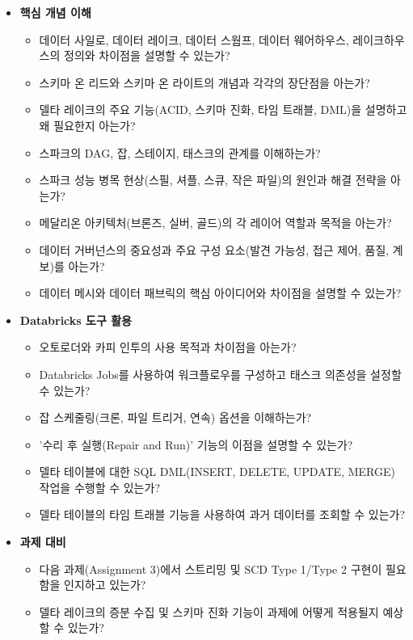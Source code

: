 \documentclass[11pt,a4paper]{article}
\begin{document}
\begin{tcolorbox}[title=\textbf{CSCI103 Lecture 5 학습 체크리스트}, colback=yellow!5!white, colframe=yellow!75!black, sharp corners, boxrule=0.8pt]
\begin{itemize}
    \item \textbf{핵심 개념 이해}
    \begin{itemize}
        \item [ ] 데이터 사일로, 데이터 레이크, 데이터 스웜프, 데이터 웨어하우스, 레이크하우스의 정의와 차이점을 설명할 수 있는가?
        \item [ ] 스키마 온 리드와 스키마 온 라이트의 개념과 각각의 장단점을 아는가?
        \item [ ] 델타 레이크의 주요 기능(ACID, 스키마 진화, 타임 트래블, DML)을 설명하고 왜 필요한지 아는가?
        \item [ ] 스파크의 DAG, 잡, 스테이지, 태스크의 관계를 이해하는가?
        \item [ ] 스파크 성능 병목 현상(스필, 셔플, 스큐, 작은 파일)의 원인과 해결 전략을 아는가?
        \item [ ] 메달리온 아키텍처(브론즈, 실버, 골드)의 각 레이어 역할과 목적을 아는가?
        \item [ ] 데이터 거버넌스의 중요성과 주요 구성 요소(발견 가능성, 접근 제어, 품질, 계보)를 아는가?
        \item [ ] 데이터 메시와 데이터 패브릭의 핵심 아이디어와 차이점을 설명할 수 있는가?
    \end{itemize}
    \item \textbf{Databricks 도구 활용}
    \begin{itemize}
        \item [ ] 오토로더와 카피 인투의 사용 목적과 차이점을 아는가?
        \item [ ] Databricks Jobs를 사용하여 워크플로우를 구성하고 태스크 의존성을 설정할 수 있는가?
        \item [ ] 잡 스케줄링(크론, 파일 트리거, 연속) 옵션을 이해하는가?
        \item [ ] '수리 후 실행(Repair and Run)' 기능의 이점을 설명할 수 있는가?
        \item [ ] 델타 테이블에 대한 SQL DML(INSERT, DELETE, UPDATE, MERGE) 작업을 수행할 수 있는가?
        \item [ ] 델타 테이블의 타임 트래블 기능을 사용하여 과거 데이터를 조회할 수 있는가?
    \end{itemize}
    \item \textbf{과제 대비}
    \begin{itemize}
        \item [ ] 다음 과제(Assignment 3)에서 스트리밍 및 SCD Type 1/Type 2 구현이 필요함을 인지하고 있는가?
        \item [ ] 델타 레이크의 증분 수집 및 스키마 진화 기능이 과제에 어떻게 적용될지 예상할 수 있는가?
    \end{itemize}
\end{itemize}
\end{tcolorbox}
\end{document}
